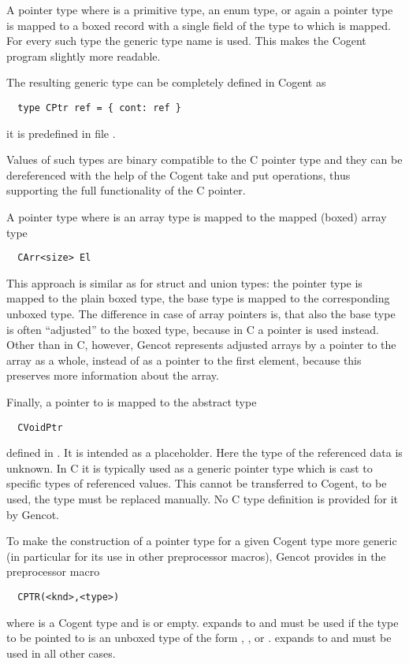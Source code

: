 A pointer type  where  is a primitive type, an enum type, 
or again a pointer type is mapped to a boxed record with a single field  of the type  to which  is 
mapped. For every such type the generic type  name is used. This makes the 
Cogent program slightly more readable. 

The resulting generic type can be completely defined in Cogent as
\begin{verbatim}
  type CPtr ref = { cont: ref }
\end{verbatim}
it is predefined in file .

Values of such types are binary compatible to the C pointer type and they can be dereferenced with the help of
the Cogent take and put operations, thus supporting the full functionality of the C pointer.

A pointer type  where  is an array type is mapped to the mapped (boxed) array type 
\begin{verbatim}
  CArr<size> El
\end{verbatim}
This approach is similar as for struct and union types: the pointer type is mapped to the plain boxed type,
the base type is mapped to the corresponding unboxed type. The difference in case of array pointers is, that also the base
type is often ``adjusted'' to the boxed type, because in C a pointer is used instead. Other than in C, however, Gencot
represents adjusted arrays by a pointer to the array as a whole, instead of as a pointer to the first element, because
this preserves more information about the array.

Finally, a pointer to  is mapped to the abstract type
\begin{verbatim}
  CVoidPtr
\end{verbatim}
defined in .
It is intended as a placeholder. Here the type of the referenced data is unknown. In C it is typically used 
as a generic pointer type which is cast to specific types of referenced values. This cannot be transferred to
Cogent, to be used, the type must be replaced manually. No C type definition is provided for it by Gencot.

To make the construction of a pointer type for a given Cogent type more generic (in particular for its use 
in other preprocessor macros), Gencot provides in  the preprocessor macro
\begin{verbatim}
  CPTR(<knd>,<type>)
\end{verbatim}
where  is a Cogent type and  is  or empty.  expands to  and
must be used if the type to be pointed to is an unboxed type of the form , , or
.  expands to  and must be used in all other cases.

